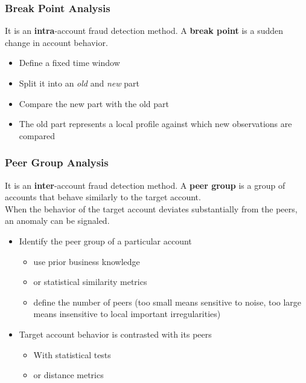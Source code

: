         \subsubsection{Break Point Analysis}
            It is an \textbf{intra}-account fraud detection method. A \textbf{break point} is a sudden change in account behavior.
            \begin{itemize}
                \item Define a fixed time window
                \item Split it into an \textit{old} and \textit{new} part 
                \item Compare the new part with the old part
                \item The old part represents a local profile against which new observations are compared 
            \end{itemize}
        \subsubsection{Peer Group Analysis}
        It is an \textbf{inter}-account fraud detection method. A \textbf{peer group} is a group of accounts that behave similarly to the target account.\\
        When the behavior of the target account deviates substantially from the peers, an anomaly can be signaled.
        \begin{itemize}
            \item Identify the peer group of a particular account
            \begin{itemize}
                \item use prior business knowledge 
                \item or statistical similarity metrics 
                \item define the number of peers (too small means sensitive to noise, too large means insensitive to local important irregularities)
            \end{itemize}
            \item Target account behavior is contrasted with its peers
            \begin{itemize}
                \item With statistical tests 
                \item or distance metrics
            \end{itemize}
        \end{itemize}
